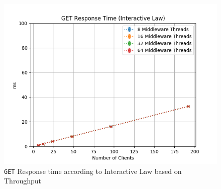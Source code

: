 \documentclass[11pt,a4paper]{article}
\begin{document}
%
\begin{figure}[H]
	\centering
    \begin{minipage}{0.5\textwidth}
        \includegraphics[width=\textwidth]{../illustrations/plots/2_2_two_middlewares/0-1/middleware_interactive_get_rt_ms.png}
        \caption{\texttt{GET} Response time according to Interactive Law based on Throughput}
        \label{fig:two_middlewares_get_rt_it}
    \end{minipage}\hfill
\end{figure}
%
\end{document}
